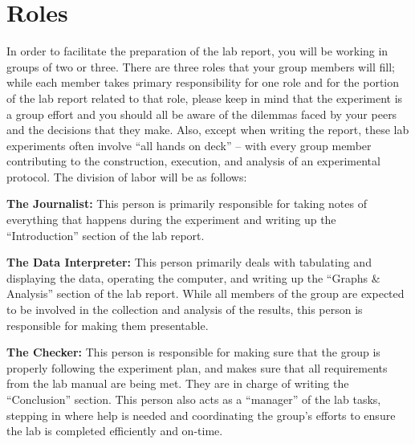 \section*{Roles}
In order to facilitate the preparation of the lab report, you will be working in groups of two or three.  There are three roles that your group members will fill; while each member takes primary responsibility for one role and for the portion of the lab report related to that role, please keep in mind that the experiment is a group effort and you should all be aware of the dilemmas faced by your peers and the decisions that they make.  Also, except when writing the report, these lab experiments often involve ``all hands on deck'' -- with every group member contributing to the construction, execution, and analysis of an experimental protocol.  The division of labor will be as follows:
\begin{list}{}{\itemsep=1pt} %
\item \textbf{The Journalist:} This person is primarily responsible for taking notes of everything that happens during the experiment and writing up the ``Introduction'' section of the lab report.
 
\item \textbf{The Data Interpreter:} This person primarily deals with tabulating and displaying the data, operating the computer, and writing up the ``Graphs \& Analysis'' section of the lab report. While all members of the group are expected to be involved in the collection and analysis of the results, this person is responsible for making them presentable.
 
\item \textbf{The Checker:} This person is responsible for making sure that the group is properly following the experiment plan, and makes sure that all requirements from the lab manual are being met. They are in charge of writing the ``Conclusion'' section. This person also acts as a ``manager'' of the lab tasks, stepping in where help is needed and coordinating the group's efforts to ensure the lab is completed efficiently and on-time.
\end{list}

\newpage

